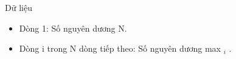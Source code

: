 Dữ liệu
\begin{itemize}
	\item     Dòng 1: Số nguyên dương N.   
	\item     Dòng i trong N dòng tiếp theo: Số nguyên dương max    $_     i    $    .   
\end{itemize}